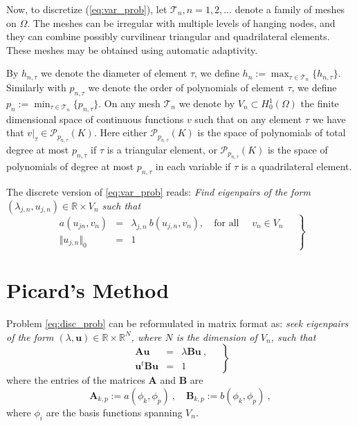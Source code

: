 \documentclass[preprint,12pt]{elsarticle}
\newcommand{\cT}{\mathcal{T}}
\begin{document}
Now, to discretize (\ref{eq:var_prob}), let $\cT_n, n =
1,2,\ldots $ denote a family of meshes on $\Omega$.
The meshes can be irregular with multiple levels of hanging nodes, 
and they can combine possibly curvilinear triangular and quadrilateral 
elements. These meshes may be obtained using automatic adaptivity. 

By $h_{n,\tau}$ we denote the diameter of element $\tau$,  
we define
$
h_n:=\max_{\tau\in \mathcal{T}_n}\{h_{n,\tau}\}.
$
Similarly with  $p_{n,\tau}$ we denote  the order of polynomials of element $\tau$,  
we define
$
p_n:=\min_{\tau\in \mathcal{T}_n}\{p_{n,\tau}\}.
$
On any mesh $\mathcal{T}_n$ we denote by $V_n \subset H^1_0(\Omega)$ the finite
dimensional space of continuous functions $v$ such that on any element $\tau$ we 
have that $v|_\tau\in \mathcal{P}_{p_{n,\tau}}(K)$. Here either $\mathcal{P}_{p_{n,\tau}}(K)$ 
is the space of polynomials of total degree at most $p_{n,\tau}$ if $\tau$ is a triangular 
element, or $\mathcal{P}_{p_{n,\tau}}(K)$ is the space of polynomials of degree at most 
$p_{n,\tau}$ in each variable if $\tau$ is a quadrilateral element.



The discrete version of \eqref{eq:var_prob} reads:
\emph{Find eigenpairs of the form $(\lambda_{j,n},u_{j,n})\in
\mathbb{R}\times V_n$
such that}
\begin{equation}
\label{eq:disc_prob}
\left.
\begin{array}{lcl}
a(u_{jn},v_{n})&=& \lambda_{j,n}\ b(u_{j,n},v_{n}),
\quad \text{for all } \quad v_{n}  \in V_n\\
 \Vert u_{j,n} \Vert_{0} &=& 1
\end{array}\quad
\right\}
\end{equation}


\section{Picard's Method}\label{sec:picard}

Problem \eqref{eq:disc_prob} can be reformulated in matrix format as:
\emph{seek eigenpairs of the form $(\lambda,\mathbf{u})\in
\mathbb{R}\times \mathbb{R}^N$, where $N$ is the dimension of $V_n$,
such that}
\begin{equation}
\label{eq:disc_prob_mat}
\left.
\begin{array}{lcl}
\mathbf{A} \mathbf{u}&=& \lambda\mathbf{B}\mathbf{u}\ ,
\\
\mathbf{u}^t\mathbf{B} \mathbf{u} &=& 1
\end{array}\quad
\right\}
\end{equation}
where the entries of the matrices $\mathbf{A}$ and $\mathbf{B}$ are 
$$
\mathbf{A}_{k,p}:=a(\phi_k,\phi_p)\ ,\quad\mathbf{B}_{k,p}:=b(\phi_k,\phi_p)\ ,
$$
where $\phi_i$ are the basis functions spanning $V_n$.
\end{document}
